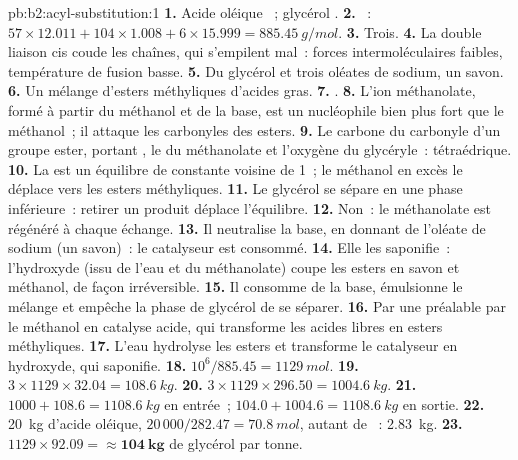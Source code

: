 \begin{solution}{pb:b2:acyl-substitution:1}
\textbf{1.} Acide oléique ~; glycérol .
\textbf{2.} ~: $57 \times 12.011 + 104 \times 1.008 + 6 \times 15.999 = \qty{885.45}{g/mol}$.
\textbf{3.} Trois.
\textbf{4.} La double liaison cis coude les chaînes, qui s'empilent mal~: forces intermoléculaires
faibles, température de fusion basse.
\textbf{5.} Du glycérol et trois oléates de sodium, un savon.
\textbf{6.} Un mélange d'esters méthyliques d'acides gras.
\textbf{7.} .
\textbf{8.} L'ion méthanolate, formé à partir du méthanol et de la base, est un nucléophile bien plus
fort que le méthanol~; il attaque les carbonyles des esters.
\textbf{9.} Le carbone du carbonyle d'un groupe ester, portant , le  du méthanolate et
l'oxygène du glycéryle~: tétraédrique.
\textbf{10.} La  est un équilibre de constante voisine de 1~; le méthanol en excès le
déplace vers les esters méthyliques.
\textbf{11.} Le glycérol se sépare en une phase inférieure~: retirer un produit déplace l'équilibre.
\textbf{12.} Non~: le méthanolate est régénéré à chaque échange.
\textbf{13.} Il neutralise la base, en donnant de l'oléate de sodium (un savon)~: le catalyseur est consommé.
\textbf{14.} Elle les saponifie~: l'hydroxyde (issu de l'eau et du méthanolate) coupe les esters en savon
et méthanol, de façon irréversible.
\textbf{15.} Il consomme de la base, émulsionne le mélange et empêche la phase de glycérol de se séparer.
\textbf{16.} Par une  préalable par le méthanol en catalyse acide, qui transforme les acides
libres en esters méthyliques.
\textbf{17.} L'eau hydrolyse les esters et transforme le catalyseur en hydroxyde, qui saponifie.
\textbf{18.} $10^6/885.45 = \qty{1129}{mol}$.
\textbf{19.} $3 \times 1129 \times 32.04 = \qty{108.6}{kg}$.
\textbf{20.} $3 \times 1129 \times 296.50 = \qty{1004.6}{kg}$.
\textbf{21.} $1000 + 108.6 = \qty{1108.6}{kg}$ en entrée~; $104.0 + 1004.6 = \qty{1108.6}{kg}$ en sortie.
\textbf{22.} \qty{20}{kg} d'acide oléique, $20\,000/282.47 = \qty{70.8}{mol}$, autant de ~:
\qty{2.83}{kg}.
\textbf{23.} $1129 \times 92.09 = \boldsymbol{\approx \qty{104}{kg}}$ de glycérol par tonne.
\end{solution}
